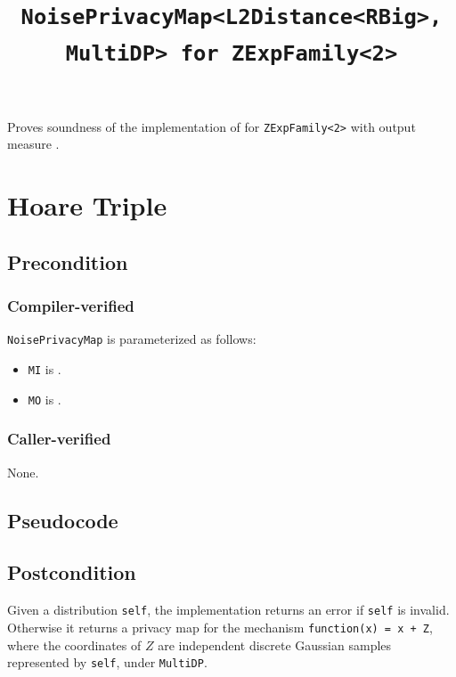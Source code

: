 \documentclass{article}
\title{\texttt{NoisePrivacyMap<L2Distance<RBig>, MultiDP> for ZExpFamily<2>}}
\author{\MichaelShoemateAuthor}
\date{}
\begin{document}
\maketitle

\contrib
Proves soundness of the implementation of
 for
\texttt{ZExpFamily<2>} with output measure
.

\section{Hoare Triple}
\subsection*{Precondition}
\subsubsection*{Compiler-verified}
\texttt{NoisePrivacyMap} is parameterized as follows:
\begin{itemize}
    \item \texttt{MI} is .
    \item \texttt{MO} is .
\end{itemize}

\subsubsection*{Caller-verified}
None.

\subsection*{Pseudocode}


\subsection*{Postcondition}
\begin{theorem}
Given a distribution \texttt{self}, the implementation returns an error if
\texttt{self} is invalid. Otherwise it returns a privacy map for the mechanism
\texttt{function(x) = x + Z}, where the coordinates of $Z$ are independent
discrete Gaussian samples represented by \texttt{self}, under
\texttt{MultiDP}.
\end{theorem}
\end{document}
